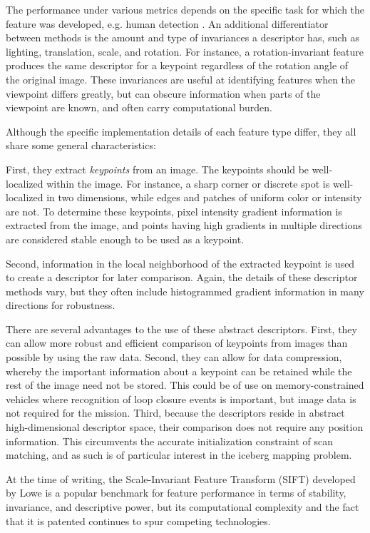 The performance under various metrics depends on the specific task for which the feature was developed, e.g. human detection \cite{Dalal2005}. An additional differentiator between methods is the amount and type of invariances a descriptor has, such as lighting, translation, scale, and rotation. For instance, a rotation-invariant feature produces the same descriptor for a keypoint regardless of the rotation angle of the original image. These invariances are useful at identifying features when the viewpoint differs greatly, but can obscure information when parts of the viewpoint are known, and often carry computational burden. 

Although the specific implementation details of each feature type differ, they all share some general characteristics:

First, they extract \emph{keypoints} from an image. The keypoints should be well-localized within the image. For instance, a sharp corner or discrete spot is well-localized in two dimensions, while edges and patches of uniform color or intensity are not. To determine these keypoints, pixel intensity gradient information is extracted from the image, and points having high gradients in multiple directions are considered stable enough to be used as a keypoint. 

Second, information in the local neighborhood of the extracted keypoint is used to create a descriptor for later comparison. Again, the details of these descriptor methods vary, but they often include histogrammed gradient information in many directions for robustness. 

There are several advantages to the use of these abstract descriptors. First, they can allow more robust and efficient comparison of keypoints from images than possible by using the raw data. Second, they can allow for data compression, whereby the important information about a keypoint can be retained while the rest of the image need not be stored. This could be of use on memory-constrained vehicles where recognition of loop closure events is important, but image data is not required for the mission. Third, because the descriptors reside in abstract high-dimensional descriptor space, their comparison does not require any position information. This circumvents the accurate initialization constraint of scan matching, and as such is of particular interest in the iceberg mapping problem.

At the time of writing, the Scale-Invariant Feature Transform (SIFT) developed by Lowe \cite{Lowe2004} is a popular benchmark for feature performance in terms of stability, invariance, and descriptive power, but its computational complexity and the fact that it is patented continues to spur competing technologies.

